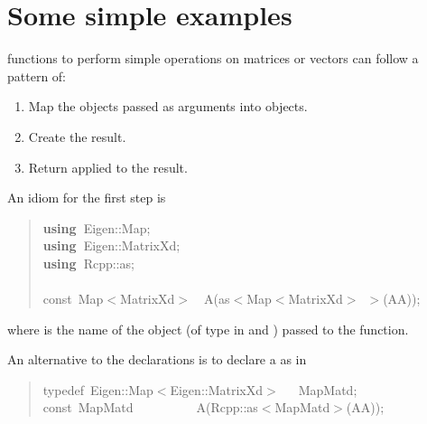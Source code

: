 \documentclass[shortnames,article]{jss}
\newcommand{\hlstd}[1]{\textcolor[rgb]{0,0,0}{#1}}
\newcommand{\hlopt}[1]{\textcolor[rgb]{0,0,0}{#1}}
\newcommand{\hlsym}[1]{\textcolor[rgb]{0,0,0}{#1}}
\newcommand{\hlkwa}[1]{\textcolor[rgb]{0.61,0.13,0.93}{\bf{#1}}}
\newcommand{\hlkwb}[1]{\textcolor[rgb]{0.13,0.54,0.13}{#1}}
\newcommand{\hlkwc}[1]{\textcolor[rgb]{0,0,1}{#1}}
\newcommand{\hlkwd}[1]{\textcolor[rgb]{0,0,0}{#1}}
\begin{document}
\section{Some simple examples}
\label{sec:simple}

 functions to perform simple operations on matrices or
vectors can follow a pattern of:
\begin{enumerate}
\item Map the  objects passed as arguments into  objects.
\item Create the result.
\item Return  applied to the result.
\end{enumerate}

An idiom for the first step is
%
\begin{quote}
  \noindent
  \ttfamily
  \hlstd{}\hlkwa{using\ }\hlstd{Eigen}\hlsym{::}\hlstd{Map}\hlsym{;}\hspace*{\fill}\\
  \hlstd{}\hlkwa{using\ }\hlstd{Eigen}\hlsym{::}\hlstd{MatrixXd}\hlsym{;}\hspace*{\fill}\\
  \hlstd{}\hlkwa{using\ }\hlstd{Rcpp}\hlsym{::}\hlstd{as}\hlsym{;}\hspace*{\fill}\\
  \hlstd{}\hspace*{\fill}\\
  \hlkwb{const\ }\hlstd{Map}\hlsym{$<$}\hlstd{MatrixXd}\hlsym{$>$}\hlstd{\ \ }\hlsym{}\hlstd{}\hlkwd{A}\hlstd{}\hlsym{(}\hlstd{as}\hlsym{$<$}\hlstd{Map}\hlsym{$<$}\hlstd{MatrixXd}\hlsym{$>$\ $>$(}\hlstd{AA}\hlsym{));}\hlstd{}\hspace*{\fill}\\
  \mbox{}
  \normalfont
\end{quote}
where  is the name of the  object (of type  in
 and ) passed to the  function.

An alternative to the  declarations is to declare a  as in
\begin{quote}
  \noindent
  \ttfamily
  \hlstd{}\hlkwc{typedef\ }\hlstd{Eigen}\hlopt{::}\hlstd{Map}\hlopt{$<$}\hlstd{Eigen}\hlopt{::}\hlstd{MatrixXd}\hlopt{$>$}\hlstd{\ \ \ }\hlopt{}\hlstd{MapMatd}\hlopt{;}\hspace*{\fill}\\
  \hlstd{}\hlkwb{const\ }\hlstd{MapMatd}\hlstd{\ \ \ \ \ \ \ \ \ \ }\hlstd{}\hlkwd{A}\hlstd{}\hlopt{(}\hlstd{Rcpp}\hlopt{::}\hlstd{as}\hlopt{$<$}\hlstd{MapMatd}\hlopt{$>$(}\hlstd{AA}\hlopt{));}\hlstd{}\hspace*{\fill}\\
  \mbox{}
  \normalfont
  \normalsize
\end{quote}
\end{document}
